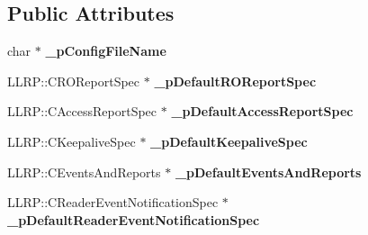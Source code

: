 \subsection*{Public Attributes}
\begin{DoxyCompactItemize}
\item 
\hypertarget{class_e_l_f_i_n_1_1_l_l_r_p_reader_config_a8eedf26161181c2ca8df8da811f75fb0}{char $\ast$ {\bfseries \-\_\-p\-Config\-File\-Name}}\label{class_e_l_f_i_n_1_1_l_l_r_p_reader_config_a8eedf26161181c2ca8df8da811f75fb0}

\item 
\hypertarget{class_e_l_f_i_n_1_1_l_l_r_p_reader_config_a0a973a98e996c0f938a73e10c092b8f6}{L\-L\-R\-P\-::\-C\-R\-O\-Report\-Spec $\ast$ {\bfseries \-\_\-p\-Default\-R\-O\-Report\-Spec}}\label{class_e_l_f_i_n_1_1_l_l_r_p_reader_config_a0a973a98e996c0f938a73e10c092b8f6}

\item 
\hypertarget{class_e_l_f_i_n_1_1_l_l_r_p_reader_config_a365badc2a55000ea5e5418f1a0caa2e7}{L\-L\-R\-P\-::\-C\-Access\-Report\-Spec $\ast$ {\bfseries \-\_\-p\-Default\-Access\-Report\-Spec}}\label{class_e_l_f_i_n_1_1_l_l_r_p_reader_config_a365badc2a55000ea5e5418f1a0caa2e7}

\item 
\hypertarget{class_e_l_f_i_n_1_1_l_l_r_p_reader_config_a6ddbccd547e9ac044c71e2e5748cda29}{L\-L\-R\-P\-::\-C\-Keepalive\-Spec $\ast$ {\bfseries \-\_\-p\-Default\-Keepalive\-Spec}}\label{class_e_l_f_i_n_1_1_l_l_r_p_reader_config_a6ddbccd547e9ac044c71e2e5748cda29}

\item 
\hypertarget{class_e_l_f_i_n_1_1_l_l_r_p_reader_config_af47f84dedf9c34699e002cf4923cfebe}{L\-L\-R\-P\-::\-C\-Events\-And\-Reports $\ast$ {\bfseries \-\_\-p\-Default\-Events\-And\-Reports}}\label{class_e_l_f_i_n_1_1_l_l_r_p_reader_config_af47f84dedf9c34699e002cf4923cfebe}

\item 
\hypertarget{class_e_l_f_i_n_1_1_l_l_r_p_reader_config_a3ae04ccf93bf633df9a6f9000d00c7aa}{L\-L\-R\-P\-::\-C\-Reader\-Event\-Notification\-Spec $\ast$ {\bfseries \-\_\-p\-Default\-Reader\-Event\-Notification\-Spec}}\label{class_e_l_f_i_n_1_1_l_l_r_p_reader_config_a3ae04ccf93bf633df9a6f9000d00c7aa}


\end{DoxyCompactItemize}
